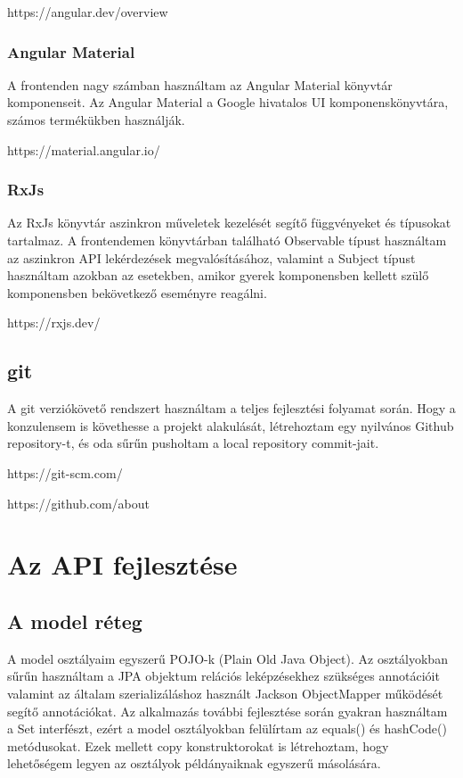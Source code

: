 \documentclass[a4paper,12pt]{report}
\theoremstyle{definition}
\theoremstyle{remark}
\begin{document}
https://angular.dev/overview
	\subsection{Angular Material}

A frontenden nagy számban használtam az Angular Material könyvtár komponenseit. Az Angular Material a Google hivatalos UI komponenskönyvtára, számos termékükben használják.

https://material.angular.io/
	\subsection{RxJs}

Az RxJs könyvtár aszinkron műveletek kezelését segítő függvényeket és típusokat tartalmaz. A frontendemen könyvtárban található Observable típust használtam az aszinkron API lekérdezések megvalósításához, valamint a Subject típust használtam azokban az esetekben, amikor gyerek komponensben kellett szülő komponensben bekövetkező eseményre reagálni.

https://rxjs.dev/

\section{git}

A git verziókövető rendszert használtam a teljes fejlesztési folyamat során. Hogy a konzulensem is követhesse a projekt alakulását, létrehoztam egy nyilvános Github repository-t, és oda sűrűn pusholtam a local repository commit-jait.

https://git-scm.com/

https://github.com/about

\chapter{Az API fejlesztése}

\section{A model réteg}

A model osztályaim egyszerű POJO-k (Plain Old Java Object). Az osztályokban sűrűn használtam a JPA objektum relációs leképzésekhez szükséges annotációit valamint az általam szerializáláshoz használt Jackson ObjectMapper működését segítő annotációkat. Az alkalmazás további fejlesztése során gyakran használtam a Set interfészt, ezért a model osztályokban felülírtam az equals() és hashCode() metódusokat. Ezek mellett copy konstruktorokat is létrehoztam, hogy lehetőségem legyen az osztályok példányaiknak egyszerű másolására.
\end{document}
